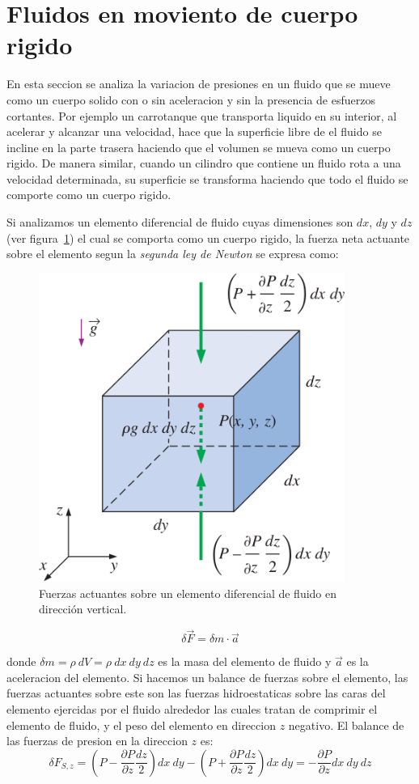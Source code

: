 \documentclass[10pt, oneside]{article}
\begin{document}
\section{Fluidos en moviento de cuerpo rigido}
En esta seccion se analiza la variacion de presiones en un fluido que se mueve como un cuerpo solido con o sin aceleracion y sin la presencia de esfuerzos cortantes. Por ejemplo un carrotanque que transporta liquido en su interior, al acelerar y alcanzar una velocidad, hace que la superficie libre de el fluido se incline en la parte trasera haciendo que el volumen se mueva como un cuerpo rigido. De manera similar, cuando un cilindro que contiene un fluido rota a una velocidad determinada, su superficie se transforma haciendo que todo el fluido se comporte como un cuerpo rigido.

Si analizamos un elemento diferencial de fluido cuyas dimensiones son $dx$, $dy$ y $dz$ (ver figura~\ref{body}) el cual se comporta como un cuerpo rigido, la fuerza neta actuante sobre el elemento segun la \emph{segunda ley de Newton} se expresa como:
\begin{figure}[h]
\centering
\includegraphics[width=10cm]{body}
\caption{Fuerzas actuantes sobre un elemento diferencial de fluido en direcci\'on vertical.} 
\label{body}
\end{figure}


\begin{equation}
\delta \vec{F} = \delta m \cdot \vec{a}
\label{bd1}
\end{equation}

donde $\delta m = \rho\ dV = \rho\ dx\ dy\ dz$ es la masa del elemento de fluido y $\vec{a}$ es la aceleracion del elemento. Si hacemos un balance de fuerzas sobre el elemento, las fuerzas actuantes sobre este son las fuerzas hidroestaticas sobre las caras del elemento ejercidas por el fluido alrededor las cuales tratan de comprimir el elemento de fluido,  y el peso del elemento en direccion $z$ negativo. El balance de las fuerzas de presion en la direccion $z$ es:
$$
\delta F_{S,z} = \left( P - \frac{\partial P}{\partial z} \frac{dz}{2} \right) dx\ dy - \left( P + \frac{\partial P}{\partial z} \frac{dz}{2} \right) dx\ dy = -\frac{\partial P}{\partial z} dx\ dy\ dz
$$
\end{document}
